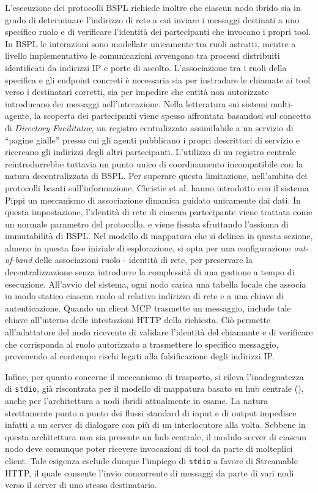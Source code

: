 L'esecuzione dei protocolli BSPL richiede inoltre che ciascun nodo ibrido sia in grado di determinare l'indirizzo di rete a cui inviare i messaggi destinati a uno specifico ruolo e di verificare l'identità dei partecipanti che invocano i propri tool. In BSPL le interazioni sono modellate unicamente tra ruoli astratti, mentre a livello implementativo le comunicazioni avvengono tra processi distribuiti identificati da indirizzi IP e porte di ascolto. L'associazione tra i ruoli della specifica e gli endpoint concreti è necessaria sia per instradare le chiamate ai tool verso i destinatari corretti, sia per impedire che entità non autorizzate introducano dei messaggi nell'interazione. 
Nella letteratura sui sistemi multi-agente, la scoperta dei partecipanti viene spesso affrontata basandosi sul concetto di \emph{Directory Facilitator}, un registro centralizzato assimilabile a un servizio di ``pagine gialle'' presso cui gli agenti pubblicano i propri descrittori di servizio e ricercano gli indirizzi degli altri partecipanti.
L'utilizzo di un registro centrale reintrodurrebbe tuttavia un punto unico di coordinamento incompatibile con la natura decentralizzata di BSPL. Per superare questa limitazione, nell'ambito dei protocolli basati sull'informazione, Christie et al. hanno introdotto con il sistema Pippi \autocite{christie2022pippi} un meccanismo di associazione dinamica guidato unicamente dai dati. In questa impostazione, l'identità di rete di ciascun partecipante viene trattata come un normale parametro del protocollo, e viene fissata sfruttando l'assioma di immutabilità di BSPL.
Nel modello di mappatura che si delinea in questa sezione, almeno in questa fase iniziale di esplorazione, si opta per una configurazione \emph{out-of-band} delle associazioni ruolo - identità di rete, per preservare la decentralizzazione senza introdurre la complessità di una gestione a tempo di esecuzione. All'avvio del sistema, ogni nodo carica una tabella locale che associa in modo statico ciascun ruolo al relativo indirizzo di rete e a una chiave di autenticazione. Quando un client MCP trasmette un messaggio, include tale chiave all'interno delle intestazioni HTTP della richiesta. Ciò permette all'adattatore del nodo ricevente di validare l'identità del chiamante e di verificare che corrisponda al ruolo autorizzato a trasmettere lo specifico messaggio, prevenendo al contempo rischi legati alla falsificazione degli indirizzi IP.

Infine, per quanto concerne il meccanismo di trasporto, si rileva l'inadeguatezza di \texttt{stdio}, già riscontrata per il modello di mappatura basato su hub centrale (), anche per l'architettura a nodi ibridi attualmente in esame. La natura strettamente punto a punto dei flussi standard di input e di output impedisce infatti a un server di dialogare con più di un interlocutore alla volta. Sebbene in questa architettura non sia presente un hub centrale, il modulo server di ciascun nodo deve comunque poter ricevere invocazioni di tool da parte di molteplici client. Tale esigenza esclude dunque l'impiego di \texttt{stdio} a favore di Streamable HTTP, il quale consente l'invio concorrente di messaggi da parte di vari nodi verso il server di uno stesso destinatario.

